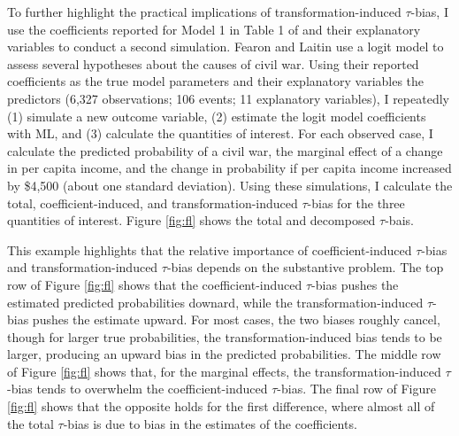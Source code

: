 \documentclass[12pt]{article}
\begin{document}
To further highlight the practical implications of transformation-induced $\tau$-bias, I use the coefficients reported for Model 1 in Table 1 of \citet[p. 84]{FearonLaitin2003} and their explanatory variables to conduct a second simulation. 
Fearon and Laitin use a logit model to assess several hypotheses about the causes of civil war.
Using their reported coefficients as the true model parameters and their explanatory variables the predictors (6,327 observations; 106 events; 11 explanatory variables), I repeatedly (1) simulate a new outcome variable, (2) estimate the logit model coefficients with ML, and (3) calculate the quantities of interest.
For each observed case, I calculate the predicted probability of a civil war, the marginal effect of a change in per capita income, and the change in probability if per capita income increased by \$4,500 (about one standard deviation).
Using these simulations, I calculate the total, coefficient-induced, and transformation-induced $\tau$-bias for the three quantities of interest. 
Figure \ref{fig:fl} shows the total and decomposed $\tau$-bais.

This example highlights that the relative importance of coefficient-induced $\tau$-bias and transformation-induced $\tau$-bias depends on the substantive problem.
The top row of Figure \ref{fig:fl} shows that the coefficient-induced $\tau$-bias pushes the estimated predicted probabilities downard, while the transformation-induced $\tau$-bias pushes the estimate upward. 
For most cases, the two biases roughly cancel, though for larger true probabilities, the transformation-induced bias tends to be larger, producing an upward bias in the predicted probabilities.
The middle row of Figure \ref{fig:fl} shows that, for the marginal effects, the transformation-induced $\tau$-bias tends to overwhelm the coefficient-induced $\tau$-bias.
The final row of Figure \ref{fig:fl} shows that the opposite holds for the first difference, where almost all of the total $\tau$-bias is due to bias in the estimates of the coefficients.
\end{document}
